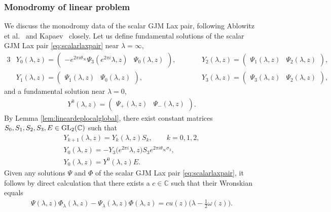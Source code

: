 \documentclass[pdftex]{sigma}
\numberwithin{equation}{section}
\newcommand{\om}{\omega}
\begin{document}
\subsubsection{Monodromy of linear problem}
We discuss the monodromy data of the scalar GJM Lax pair, following Ablowitz et al.~\cite{fokasmugan1988} and Kapaev~\cite{kapaev1996,kapaev1998} closely. Let us def\/ine fundamental solutions of the scalar GJM Lax pair \eqref{eq:scalarlaxpair} near $\lambda=\infty$,
\begin{alignat*}{3}
& Y_0(\lambda,z) =\begin{pmatrix}
-e^{2\pi i \theta_\infty}\Psi_3(e^{2\pi i}\lambda,z) & \Psi_0(\lambda,z)
\end{pmatrix},\qquad &&
Y_2(\lambda,z) =\begin{pmatrix}
\Psi_1(\lambda,z) & \Psi_2(\lambda,z)
\end{pmatrix},& \\
& Y_1(\lambda,z) =\begin{pmatrix}
\Psi_1(\lambda,z) & \Psi_0(\lambda,z)
\end{pmatrix},\qquad &&
Y_3(\lambda,z)=\begin{pmatrix}
\Psi_3(\lambda,z) & \Psi_2(\lambda,z)
\end{pmatrix},&
\end{alignat*}
and a fundamental solution near $\lambda=0$,
\begin{gather*}
Y^0(\lambda,z)=\begin{pmatrix}
\Psi_+(\lambda,z) & \Psi_-(\lambda,z)
\end{pmatrix}.
\end{gather*}
By Lemma \ref{lem:lineardeplocalglobal}, there exist constant matrices $S_0,S_1,S_2,S_3,E\in {\rm GL}_2(\mathbb{C})$ such that
\begin{gather}
Y_{k+1}(\lambda,z) =Y_{k}(\lambda,z)S_k,\qquad k=0,1,2,\nonumber\\
Y_{0}(\lambda,z) =-Y_{3}\big(e^{2\pi i}\lambda,z\big)S_3e^{2\pi i \theta_\infty \sigma_3},\nonumber\\
Y_{0}(\lambda,z) =Y^{0}(\lambda,z)E.\label{eq:connection}
\end{gather}
Given any solutions $\Psi$ and $\Phi$ of the scalar GJM Lax pair \eqref{eq:scalarlaxpair}, it follows by direct calculation that there exists a $c\in\mathbb{C}$ such that their Wronskian equals
\begin{gather*}
\Psi(\lambda,z)\Phi_\lambda(\lambda,z)-\Psi_\lambda(\lambda,z)\Phi(\lambda,z)=c u(z)\big(\lambda-\tfrac{1}{2}\om(z)\big).
\end{gather*}
\end{document}
